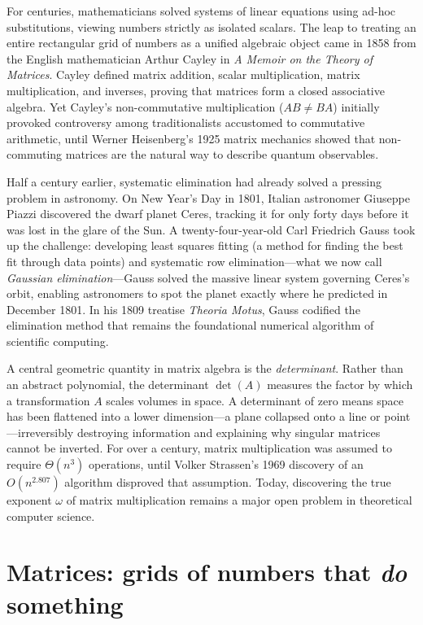 \begin{historybox}
For centuries, mathematicians solved systems of linear equations using ad-hoc
substitutions, viewing numbers strictly as isolated scalars. The leap to treating
an entire rectangular grid of numbers as a unified algebraic object came in 1858
from the English mathematician Arthur Cayley in \emph{A Memoir on the Theory of
Matrices}. Cayley defined matrix addition, scalar multiplication, matrix
multiplication, and inverses, proving that matrices form a closed associative
algebra. Yet Cayley's non-commutative multiplication ($AB \ne BA$) initially
provoked controversy among traditionalists accustomed to commutative arithmetic,
until Werner Heisenberg's 1925 matrix mechanics showed that non-commuting
matrices are the natural way to describe quantum observables.

Half a century earlier, systematic elimination had already solved a pressing
problem in astronomy. On New Year's Day in 1801, Italian astronomer Giuseppe
Piazzi discovered the dwarf planet Ceres, tracking it for only forty days before
it was lost in the glare of the Sun. A twenty-four-year-old Carl Friedrich Gauss
took up the challenge: developing least squares fitting (a method for finding the best fit through data points) and systematic row elimination---what
we now call \emph{Gaussian elimination}---Gauss solved the massive linear system
governing Ceres's orbit, enabling astronomers to spot the planet exactly where he
predicted in December 1801. In his 1809 treatise \emph{Theoria Motus}, Gauss
codified the elimination method that remains the foundational numerical algorithm
of scientific computing.

A central geometric quantity in matrix algebra is the \emph{determinant}.
Rather than an abstract polynomial, the determinant $\det(A)$ measures the factor by
which a transformation $A$ scales volumes in space. A determinant of zero means space
has been flattened into a lower dimension---a plane collapsed onto a line or point---irreversibly
destroying information and explaining why singular matrices cannot be inverted. For
over a century, matrix multiplication was assumed to require $\Theta(n^3)$ operations,
until Volker Strassen's 1969 discovery of an $O(n^{2.807})$ algorithm disproved that
assumption. Today, discovering the true exponent $\omega$ of matrix multiplication
remains a major open problem in theoretical computer science.
\end{historybox}

\section{Matrices: grids of numbers that \emph{do} something}
\label{ch39:matrices-intro}

